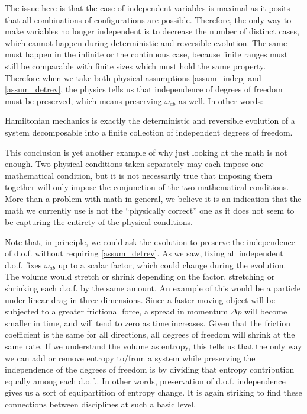 The issue here is that the case of independent variables is maximal as it posits that all combinations of configurations are possible. Therefore, the only way to make variables no longer independent is to decrease the number of distinct cases, which cannot happen during deterministic and reversible evolution. The same must happen in the infinite or the continuous case, because finite ranges must still be comparable with finite sizes which must hold the same property. Therefore when we take both physical assumptions \ref{assum_indep} and \ref{assum_detrev}, the physics tells us that independence of degrees of freedom must be preserved, which means preserving $\omega_{ab}$ as well. In other words:
\begin{insight}
	Hamiltonian mechanics is exactly the deterministic and reversible evolution of a system decomposable into a finite collection of independent degrees of freedom.
\end{insight} 

This conclusion is yet another example of why just looking at the math is not enough. Two physical conditions taken separately may each impose one mathematical condition, but it is not necessarily true that imposing them together will only impose the conjunction of the two mathematical conditions. More than a problem with math in general, we believe it is an indication that the math we currently use is not the ``physically correct'' one as it does not seem to be capturing the entirety of the physical conditions. 

Note that, in principle, we could ask the evolution to preserve the independence of d.o.f. without requiring \ref{assum_detrev}. As we saw, fixing all independent d.o.f. fixes $\omega_{ab}$ up to a scalar factor, which could change during the evolution. The volume would stretch or shrink depending on the factor, stretching or shrinking each d.o.f. by the same amount. An example of this would be a particle under linear drag in three dimensions. Since a faster moving object will be subjected to a greater frictional force, a spread in momentum $\Delta p$ will become smaller in time, and will tend to zero as time increases. Given that the friction coefficient is the same for all directions, all degrees of freedom will shrink at the same rate. If we understand the volume as entropy, this tells us that the only way we can add or remove entropy to/from a system while preserving the independence of the degrees of freedom is by dividing that entropy contribution equally among each d.o.f.. In other words, preservation of d.o.f. independence gives us a sort of equipartition of entropy change. It is again striking to find these connections between disciplines at such a basic level.


